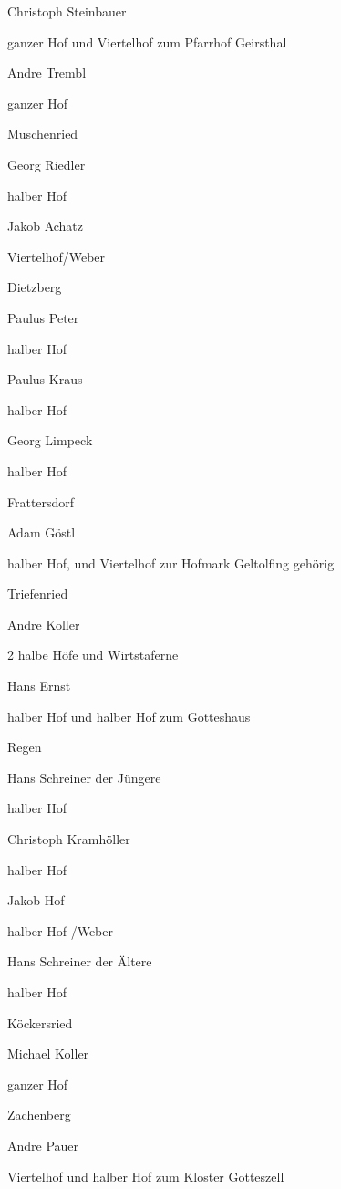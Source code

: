 \documentclass{book}
\begin{document}
Christoph Steinbauer

ganzer Hof und Viertelhof zum Pfarrhof Geirsthal



Andre Trembl

ganzer Hof

Muschenried

Georg Riedler

halber Hof



Jakob Achatz

Viertelhof/Weber

Dietzberg

Paulus Peter

halber Hof



Paulus Kraus

halber Hof



Georg Limpeck

halber Hof

Frattersdorf

Adam Göstl

halber Hof, und Viertelhof zur Hofmark Geltolfing gehörig

Triefenried

Andre Koller

2 halbe Höfe und Wirtstaferne



Hans Ernst

halber Hof und halber Hof zum Gotteshaus

Regen



Hans Schreiner der Jüngere

halber Hof



Christoph Kramhöller

halber Hof



Jakob Hof

halber Hof /Weber



Hans Schreiner der Ältere

halber Hof

Köckersried

Michael Koller

ganzer Hof

Zachenberg

Andre Pauer

Viertelhof und halber Hof zum Kloster Gotteszell
\end{document}
